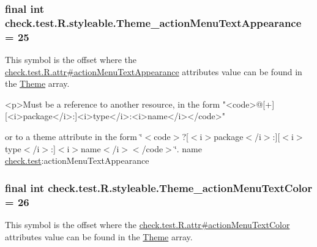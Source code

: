 \subsubsection[{Theme\+\_\+action\+Menu\+Text\+Appearance}]{\setlength{\rightskip}{0pt plus 5cm}final int check.\+test.\+R.\+styleable.\+Theme\+\_\+action\+Menu\+Text\+Appearance = 25\hspace{0.3cm}{\ttfamily [static]}}\label{classcheck_1_1test_1_1_r_1_1styleable_af897628603939c74ea86e5ec3ba329a4}
This symbol is the offset where the \hyperlink{classcheck_1_1test_1_1_r_1_1attr_aeb2f5cb8f87508e1e6720da3ab4010aa}{check.\+test.\+R.\+attr\#action\+Menu\+Text\+Appearance} attribute\textquotesingle{}s value can be found in the \hyperlink{classcheck_1_1test_1_1_r_1_1styleable_acca726d02016a0cf607782ec3a436a81}{Theme} array.

\begin{DoxyVerb}      <p>Must be a reference to another resource, in the form "<code>@[+][<i>package</i>:]<i>type</i>:<i>name</i></code>"
\end{DoxyVerb}
 or to a theme attribute in the form \char`\"{}$<$code$>$?\mbox{[}$<$i$>$package$<$/i$>$\+:\mbox{]}\mbox{[}$<$i$>$type$<$/i$>$\+:\mbox{]}$<$i$>$name$<$/i$>$$<$/code$>$\char`\"{}.  name \hyperlink{namespacecheck_1_1test}{check.\+test}\+:action\+Menu\+Text\+Appearance \hypertarget{classcheck_1_1test_1_1_r_1_1styleable_a46f47f45868d12945f240329c3a79fe7}{}
\subsubsection[{Theme\+\_\+action\+Menu\+Text\+Color}]{\setlength{\rightskip}{0pt plus 5cm}final int check.\+test.\+R.\+styleable.\+Theme\+\_\+action\+Menu\+Text\+Color = 26\hspace{0.3cm}{\ttfamily [static]}}\label{classcheck_1_1test_1_1_r_1_1styleable_a46f47f45868d12945f240329c3a79fe7}
This symbol is the offset where the \hyperlink{classcheck_1_1test_1_1_r_1_1attr_a52d949c4652ebc1902752ce243b0f3c9}{check.\+test.\+R.\+attr\#action\+Menu\+Text\+Color} attribute\textquotesingle{}s value can be found in the \hyperlink{classcheck_1_1test_1_1_r_1_1styleable_acca726d02016a0cf607782ec3a436a81}{Theme} array.

